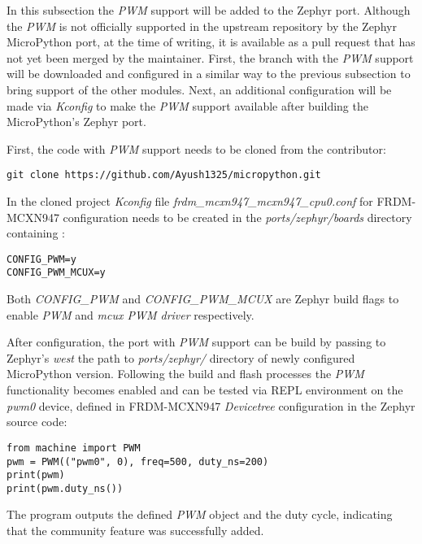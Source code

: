 \documentclass[twoside, 12pt]{article}
\begin{document}
In this subsection the \textit{PWM} support will be added to the Zephyr port. Although the 
\textit{PWM} is not officially supported in the upstream repository by the Zephyr MicroPython 
port, at the time of writing, it is available as a pull request that has not yet been merged 
by the maintainer. First, the branch with the \textit{PWM} support will be downloaded and 
configured in a similar way to the previous subsection to bring support of the other modules. 
Next, an additional configuration will be made via \textit{Kconfig} to make the \textit{PWM} 
support available after building the MicroPython's Zephyr port.

First, the code with \textit{PWM} support needs to be cloned from the contributor:
\begin{lstlisting}[caption=Obtaining MicroPython's Zephyr port version with PWM support, breaklines=true]
git clone https://github.com/Ayush1325/micropython.git
\end{lstlisting}
In the cloned project \textit{Kconfig} file \textit{frdm\_mcxn947\_mcxn947\_cpu0.conf} for 
FRDM-MCXN947 configuration needs to be created in the  \textit{ports/zephyr/boards} directory 
containing :
\begin{lstlisting}[caption=Kconfig configuration for PWM support on FRDM-MCXN947 board]
CONFIG_PWM=y
CONFIG_PWM_MCUX=y
\end{lstlisting}

Both \textit{CONFIG\_PWM}\cite{zehpyr_pwm} and 
\textit{CONFIG\_PWM\_MCUX}\cite{zehpyr_pwm_mcux} are Zephyr build flags to enable 
\textit{PWM} and \textit{mcux PWM driver} respectively.

After configuration, the port with \textit{PWM} support can be build by passing to Zephyr's
\textit{west} the path to \textit{ports/zephyr/} directory of newly configured MicroPython 
version. Following the build and flash processes the \textit{PWM} functionality becomes 
enabled and can be tested via REPL environment on the \textit{pwm0} device, defined in FRDM-MCXN947 \textit{Devicetree} configuration in the Zephyr source code:
\begin{lstlisting}[caption=Testing PWM in REPL environment of the Zephyr MicroPython port, breaklines=true]
from machine import PWM
pwm = PWM(("pwm0", 0), freq=500, duty_ns=200)
print(pwm)
print(pwm.duty_ns())
\end{lstlisting}
The program outputs the defined \textit{PWM} object and the duty cycle, indicating that
the community feature was successfully added.
\end{document}
